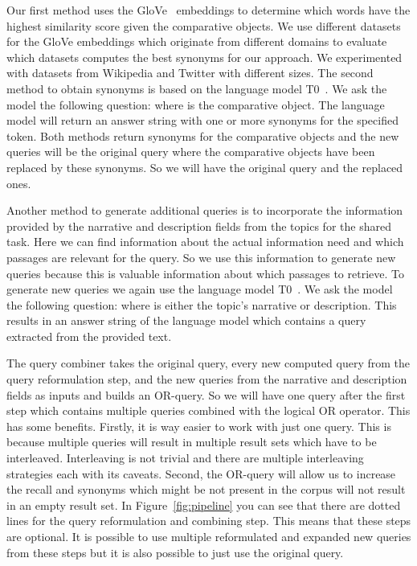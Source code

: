 Our first method uses the GloVe~\cite{PenningtonSM2014} embeddings to determine which words have the highest similarity score given the comparative objects.
We use different datasets for the GloVe embeddings which originate from different domains to evaluate which datasets computes the best synonyms for our approach.
We experimented with datasets from Wikipedia and Twitter with different sizes.
The second method to obtain synonyms is based on the language model T0~\cite{SanhWRBSACSLRDBXTSSKCNDCJWMSYPBWNRSSFFTBGBWR2021}.
We ask the model the following question:  where  is the comparative object.
The language model will return an answer string with one or more synonyms for the specified token.
Both methods return synonyms for the comparative objects and the new queries will be the original query where the comparative objects have been replaced by these synonyms.
So we will have the original query and the replaced ones.

Another method to generate additional queries is to incorporate the information provided by the narrative and description fields from the topics for the shared task.
Here we can find information about the actual information need and which passages are relevant for the query. So we use this information to generate new queries because this is valuable information about which passages to retrieve.
To generate new queries we again use the language model T0~\cite{SanhWRBSACSLRDBXTSSKCNDCJWMSYPBWNRSSFFTBGBWR2021}.
We ask the model the following question:  where  is either the topic's narrative or description.
This results in an answer string of the language model which contains a query extracted from the provided text. 

The query combiner takes the original query, every new computed query from the query reformulation step, and the new queries from the narrative and description fields as inputs and builds an OR-query.
So we will have one query after the first step which contains multiple queries combined with the logical OR operator.
This has some benefits.
Firstly, it is way easier to work with just one query.
This is because multiple queries will result in multiple result sets which have to be interleaved.
Interleaving is not trivial and there are multiple interleaving strategies each with its caveats.
Second, the OR-query will allow us to increase the recall and synonyms which might be not present in the corpus will not result in an empty result set.
In Figure~\ref{fig:pipeline} you can see that there are dotted lines for the query reformulation and combining step.
This means that these steps are optional.
It is possible to use multiple reformulated and expanded new queries from these steps but it is also possible to just use the original query.

